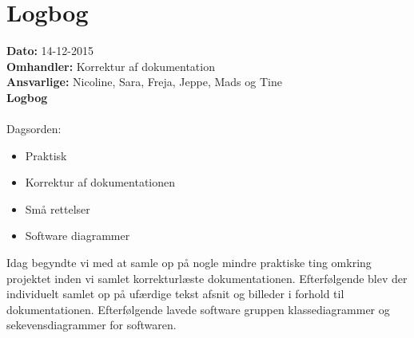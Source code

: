\section{Logbog}

\textbf{Dato:} 14-12-2015\\
\textbf{Omhandler:} Korrektur af dokumentation\\
\textbf{Ansvarlige:} Nicoline, Sara, Freja, Jeppe, Mads og Tine\\
\textbf{Logbog}
\\
\\
Dagsorden:
\begin{itemize}
	\item Praktisk
	\item Korrektur af dokumentationen
	\item Små rettelser 
	\item Software diagrammer
\end{itemize}

Idag begyndte vi med at samle op på nogle mindre praktiske ting omkring projektet inden vi samlet korrekturlæste dokumentationen. Efterfølgende blev der individuelt samlet op på ufærdige tekst afsnit og billeder i forhold til dokumentationen. 
Efterfølgende lavede software gruppen klassediagrammer og sekevensdiagrammer for softwaren. 
